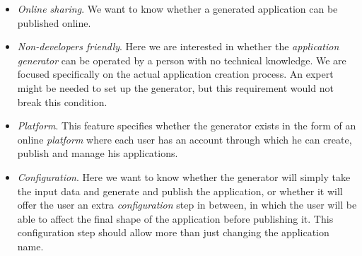 \begin{itemize}
\item \emph{Online sharing}. We want to know whether a generated application can be published online.
\item \emph{Non-developers friendly}. Here we are interested in whether the \emph{application generator} can be operated by a person with no technical knowledge. We are focused specifically on the actual application creation process. An expert might be needed to set up the generator, but this requirement would not break this condition.
\item \emph{Platform}. This feature specifies whether the generator exists in the form of an online \emph{platform} where each user has an account through which he can create, publish and manage his applications.
\item \emph{Configuration}. Here we want to know whether the generator will simply take the input data and generate and publish the application, or whether it will offer the user an extra \emph{configuration} step in between, in which the user will be able to affect the final shape of the application before publishing it. This configuration step should allow more than just changing the application name.
\end{itemize}

